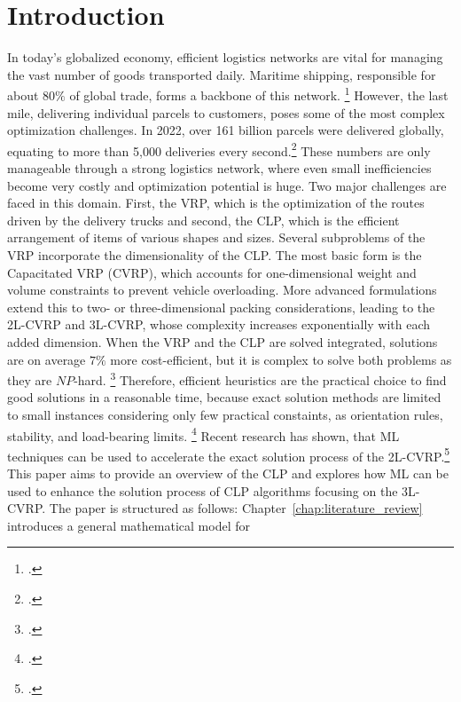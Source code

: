 \chapter{Introduction}
\label{sec:introduction}
In today’s globalized economy, efficient logistics networks are vital for managing the vast number of
goods transported daily. Maritime shipping, responsible for about $80\%$ of global trade,
forms a backbone of this network. \footcite[cf.][]{un_trade_and_development_unctad_review_2024}
However, the last mile, delivering individual parcels to customers, poses some of the most complex optimization
challenges. In 2022, over 161 billion parcels were delivered globally, equating to more than 5,000
deliveries every second.\footcite[cf.][]{statista_global_2022}
These numbers are only manageable through a strong logistics network, where even small inefficiencies
become very costly and optimization potential is huge. Two major challenges are faced in this domain.
First, the \gls{VRP}, which is the optimization of the routes driven by the delivery trucks and second,
the \gls{CLP}, which is the efficient arrangement of items of various shapes and sizes.
Several subproblems of the \gls{VRP} incorporate the dimensionality of the \gls{CLP}. The most basic form is the Capacitated VRP (CVRP),
which accounts for one-dimensional weight and volume constraints to prevent vehicle overloading.
More advanced formulations extend this to two- or three-dimensional packing considerations,
leading to the \gls{2L-CVRP} and \gls{3L-CVRP}, whose complexity increases exponentially with each added dimension.
When the \gls{VRP} and the \gls{CLP} are solved integrated,
solutions are on average $7\%$ more cost-efficient, but it is complex to solve
both problems as they are $NP$-hard. \footcite[cf.][p. 23]{cote_value_2016} Therefore, efficient heuristics are the practical
choice to find good solutions in a reasonable time, because exact solution methods are limited to
small instances considering only few practical constaints, as orientation rules, stability, and load-bearing limits. \footcite[cf.][pp. 377--378]{bischoff_issues_1995}
Recent research has shown, that \gls{ML} techniques can be used to accelerate the exact solution process
of the \gls{2L-CVRP}.\footcite[cf.][]{zhang_learning-based_2022}
This paper aims to provide an overview of the \gls{CLP} and explores how \gls{ML} can be used
to enhance the solution process of \gls{CLP} algorithms focusing on the \gls{3L-CVRP}.
The paper is structured as follows:
Chapter~\ref{chap:literature_review} introduces a general mathematical model for

